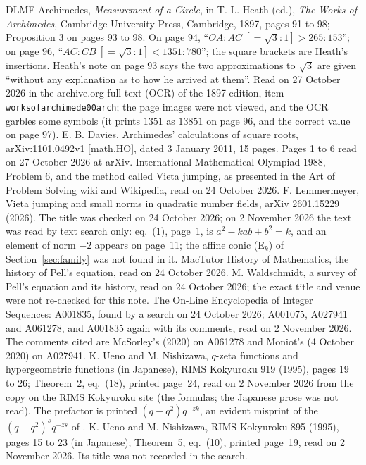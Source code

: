 \documentclass[11pt]{article}
\begin{document}
{\begin{thebibliography}{DLMF}
 Archimedes, \emph{Measurement of a Circle}, in T. L. Heath (ed.), \emph{The Works of Archimedes}, Cambridge University Press, Cambridge, 1897, pages 91 to 98; Proposition 3 on pages 93 to 98. On page 94, ``$OA:AC\ [=\sqrt3:1]>265:153$''; on page 96, ``$AC:CB\ [=\sqrt3:1]<1351:780$''; the square brackets are Heath's insertions. Heath's note on page 93 says the two approximations to $\sqrt3$ are given ``without any explanation as to how he arrived at them''. Read on 27 October 2026 in the archive.org full text (OCR) of the 1897 edition, item \texttt{worksofarchimede00arch}; the page images were not viewed, and the OCR garbles some symbols (it prints $1351$ as $13851$ on page 96, and the correct value on page 97).
 E. B. Davies, Archimedes' calculations of square roots, arXiv:1101.0492v1 [math.HO], dated 3 January 2011, 15 pages. Pages 1 to 6 read on 27 October 2026 at arXiv.
 International Mathematical Olympiad 1988, Problem 6, and the method called Vieta jumping, as presented in the Art of Problem Solving wiki and Wikipedia, read on 24 October 2026.
 F. Lemmermeyer, Vieta jumping and small norms in quadratic number fields, arXiv 2601.15229 (2026). The title was checked on 24 October 2026; on 2 November 2026 the text was read by text search only: eq.~(1), page~1, is $a^2-kab+b^2=k$, and an element of norm $-2$ appears on page~11; the affine conic (E$_k$) of Section~\ref{sec:family} was not found in it.
 MacTutor History of Mathematics, the history of Pell's equation, read on 24 October 2026.
 M. Waldschmidt, a survey of Pell's equation and its history, read on 24 October 2026; the exact title and venue were not re-checked for this note.
 The On-Line Encyclopedia of Integer Sequences: A001835, found by a search on 24 October 2026; A001075, A027941 and A061278, and A001835 again with its comments, read on 2 November 2026. The comments cited are McSorley's (2020) on A061278 and Moniot's (4 October 2020) on A027941.
 K. Ueno and M. Nishizawa, $q$-zeta functions and hypergeometric functions (in Japanese), RIMS Kokyuroku 919 (1995), pages 19 to 26; Theorem~2, eq.~(18), printed page~24, read on 2 November 2026 from the copy on the RIMS Kokyuroku site (the formulas; the Japanese prose was not read). The prefactor is printed $(q-q^2)q^{-zk}$, an evident misprint of the $(q-q^2)^sq^{-zs}$ of \cite[eq.~(32)]{UN}.
 K. Ueno and M. Nishizawa, RIMS Kokyuroku 895 (1995), pages 15 to 23 (in Japanese); Theorem~5, eq.~(10), printed page~19, read on 2 November 2026. Its title was not recorded in the search.

\end{thebibliography}}
\end{document}
